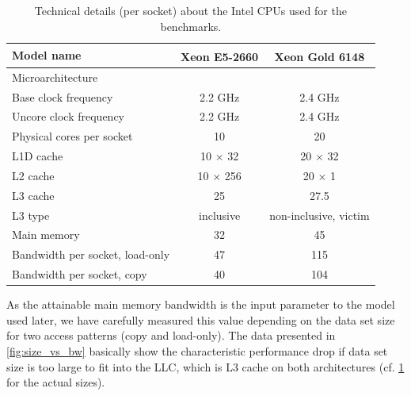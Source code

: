 \begin{table}[tbp]
	\footnotesize
	\caption{Technical details (per socket) about the Intel CPUs used for the benchmarks.}\label{tab:test_bed}
	\begin{center}
		\begin{tabular}{l|cc}
			{Model name} & {Xeon\textsuperscript{\textregistered} E5-2660} & {Xeon\textsuperscript{\textregistered} Gold 6148} \\\midrule
			{Microarchitecture} & {\IVB} & {\SKX} \\\midrule
			{Base clock frequency} & {2.2 GHz} & {2.4 GHz}\\
			{Uncore clock frequency} & {2.2 GHz} & {2.4 GHz}\\
			{Physical cores per socket} & {10} & {20} \\
			{L1D cache} & {10 $\times$ 32 \KiB} & {20 $\times$ 32 \KiB}\\
			{L2 cache} & {10 $\times$ 256 \KiB} & {20 $\times$ 1 \MiB} \\
			{L3 cache} & {25 \MiB} & {27.5 \MiB}\\
			{L3 type} & {inclusive} & {non-inclusive, victim}\\
			{Main memory} & {32 \GiB} & {45 \GiB}\\
			{Bandwidth per socket, load-only} & {47 \GBS} & {115 \GBS}\\ %
			{Bandwidth per socket, copy} & {40 \GBS} & {104 \GBS}\\
		\end{tabular}
	\end{center}
\end{table} 
As the attainable main memory bandwidth is the input parameter to the \roofline model used later, we have carefully measured this value depending on the data set size for two access patterns (copy and load-only). The data presented in \cref{fig:size_vs_bw} basically show the characteristic performance drop if data set size is too large to fit into the \acrfull{LLC}, which is L3 cache on both architectures (cf. \cref{tab:test_bed} for the actual sizes). 
